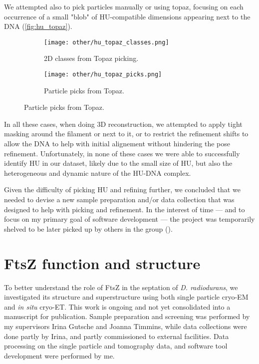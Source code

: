 We attempted also to pick particles manually or using topaz, focusing on each occurrence of a small "blob" of HU-compatible dimensions appearing next to the DNA (\autoref{fig:hu_topaz}).

\begin{figure}[ht]
    \centering
    \begin{subfigure}[B]{.49\textwidth}
        \centering
        \texttt{[image: other/hu\_topaz\_classes.png]}
        \caption{2D classes from Topaz picking.}
        \label{fig:hu_topaz_classes}
    \end{subfigure}%
    \hfill
    \begin{subfigure}[B]{.49\textwidth}
        \centering
        \texttt{[image: other/hu\_topaz\_picks.png]}
        \caption{Particle picks from Topaz.}
        \label{fig:hu_topaz_picks}
    \end{subfigure}%
    \label{fig:hu_topaz}
\end{figure}

In all these cases, when doing 3D reconstruction, we attempted to apply tight masking around the filament or next to it, or to restrict the refinement shifts to allow the DNA to help with initial alignement without hindering the pose refinement.
Unfortunately, in none of these cases we were able to successfully identify HU in our dataset, likely due to the small size of HU, but also the heterogeneous and dynamic nature of the HU-DNA complex.

\bigskip

Given the difficulty of picking HU and refining further, we concluded that we needed to devise a new sample preparation and/or data collection that was designed to help with picking and refinement.
In the interest of time --- and to focus on my primary goal of software development --- the project was temporarily shelved to be later picked up by others in the group ().


\section{FtsZ function and structure}\label{ftsz}

To better understand the role of FtsZ in the septation of \textit{D. radiodurans}, we investigated its structure and superstructure using both single particle cryo-EM and \textit{in situ} cryo-ET.
This work is ongoing and not yet consolidated into a manuscript for publication.
Sample preparation and screening was performed by my supervisors Irina Gutsche and Joanna Timmins, while data collections were done partly by Irina, and partly commissioned to external facilities.
Data processing on the single particle and tomography data, and software tool development were performed by me.

